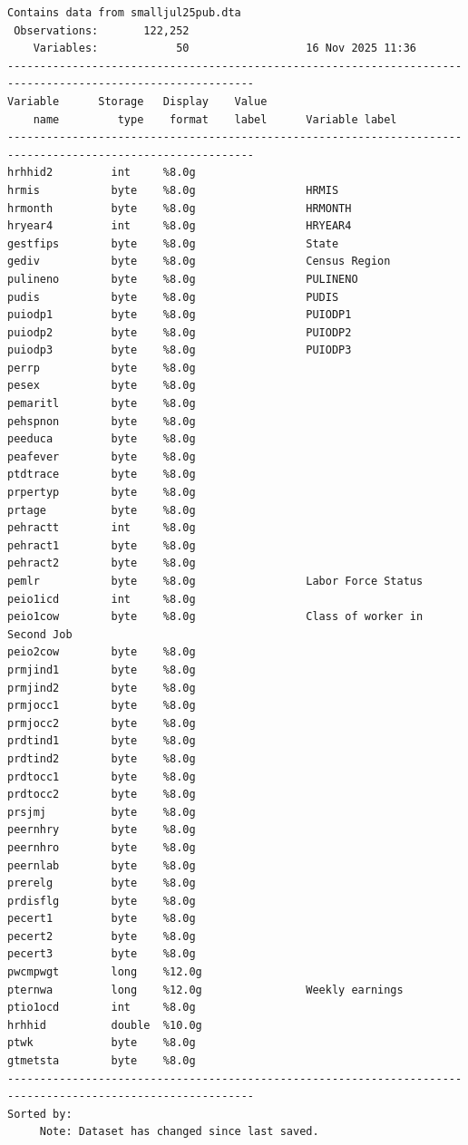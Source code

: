 \documentclass[
]{book}
\begin{document}
\begin{verbatim}
Contains data from smalljul25pub.dta
 Observations:       122,252                  
    Variables:            50                  16 Nov 2025 11:36
------------------------------------------------------------------------------------------------------------
Variable      Storage   Display    Value
    name         type    format    label      Variable label
------------------------------------------------------------------------------------------------------------
hrhhid2         int     %8.0g                 
hrmis           byte    %8.0g                 HRMIS
hrmonth         byte    %8.0g                 HRMONTH
hryear4         int     %8.0g                 HRYEAR4
gestfips        byte    %8.0g                 State
gediv           byte    %8.0g                 Census Region
pulineno        byte    %8.0g                 PULINENO
pudis           byte    %8.0g                 PUDIS
puiodp1         byte    %8.0g                 PUIODP1
puiodp2         byte    %8.0g                 PUIODP2
puiodp3         byte    %8.0g                 PUIODP3
perrp           byte    %8.0g                 
pesex           byte    %8.0g                 
pemaritl        byte    %8.0g                 
pehspnon        byte    %8.0g                 
peeduca         byte    %8.0g                 
peafever        byte    %8.0g                 
ptdtrace        byte    %8.0g                 
prpertyp        byte    %8.0g                 
prtage          byte    %8.0g                 
pehractt        int     %8.0g                 
pehract1        byte    %8.0g                 
pehract2        byte    %8.0g                 
pemlr           byte    %8.0g                 Labor Force Status
peio1icd        int     %8.0g                 
peio1cow        byte    %8.0g                 Class of worker in Second Job
peio2cow        byte    %8.0g                 
prmjind1        byte    %8.0g                 
prmjind2        byte    %8.0g                 
prmjocc1        byte    %8.0g                 
prmjocc2        byte    %8.0g                 
prdtind1        byte    %8.0g                 
prdtind2        byte    %8.0g                 
prdtocc1        byte    %8.0g                 
prdtocc2        byte    %8.0g                 
prsjmj          byte    %8.0g                 
peernhry        byte    %8.0g                 
peernhro        byte    %8.0g                 
peernlab        byte    %8.0g                 
prerelg         byte    %8.0g                 
prdisflg        byte    %8.0g                 
pecert1         byte    %8.0g                 
pecert2         byte    %8.0g                 
pecert3         byte    %8.0g                 
pwcmpwgt        long    %12.0g                
pternwa         long    %12.0g                Weekly earnings
ptio1ocd        int     %8.0g                 
hrhhid          double  %10.0g                
ptwk            byte    %8.0g                 
gtmetsta        byte    %8.0g                 
------------------------------------------------------------------------------------------------------------
Sorted by: 
     Note: Dataset has changed since last saved.
\end{verbatim}
\end{document}
